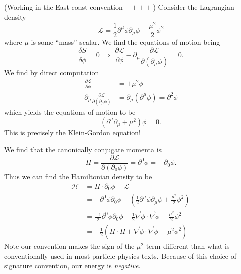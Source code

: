 \begin{ex}\begin{small}
(Working in the East coast convention $-+++$) Consider the Lagrangian density
\begin{equation}%
\mathcal{L} = \frac{1}{2}\partial^{\mu}\phi\partial_{\mu}\phi + \frac{\mu^{2}}{2}\phi^{2}
\end{equation}
where $\mu$ is some ``mass'' scalar. We find the equations of
motion being
\begin{equation}%
\frac{\delta S}{\delta \phi}=0
\;\Rightarrow\;
\frac{\partial\mathcal{L}}{\partial\phi}
-\partial_{\mu}\frac{\partial\mathcal{L}}{\partial(\partial_{\mu}\phi)}
= 0.
\end{equation}
We find by direct computation
\begin{subequations}
\begin{align}
\frac{\partial\mathcal{L}}{\partial\phi} &= +\mu^{2}\phi\\
\partial_{\mu}\frac{\partial\mathcal{L}}{\partial(\partial_{\mu}\phi)}
&= \partial_{\mu}\left(\partial^{\mu}\phi\right)=\partial^{2}\phi 
\end{align}
\end{subequations}
which yields the equations of motion to be
\begin{equation}%
\left(\partial^{\mu}\partial_{\mu}+\mu^{2}\right)\phi = 0.
\end{equation}
This is precisely the Klein-Gordon equation!

We find that the canonically conjugate momenta is
\begin{equation}%
\Pi = \frac{\partial\mathcal{L}}{\partial(\partial_{0}\phi)} =
\partial^{0}\phi = -\partial_{0}\phi.
\end{equation}
Thus we can find the Hamiltonian density to be
\begin{subequations}
\begin{align}
\mathcal{H} &= \Pi\cdot\partial_{0}\phi-\mathcal{L}\\
&= -\partial^{0}\phi\partial_{0}\phi -
\left(\frac{1}{2}\partial^{\mu}\phi\partial_{\mu}\phi+\frac{\mu^{2}}{2}\phi^{2}\right) \\
&=\frac{-1}{2}\partial^{0}\phi\partial_{0}\phi-\frac{1}{2}\vec{\nabla}\phi\cdot\vec{\nabla}\phi-\frac{\mu^{2}}{2}\phi^{2}\\
&=-\frac{1}{2}\left(\Pi\cdot\Pi+\vec{\nabla}\phi\cdot\vec{\nabla}\phi+\mu^{2}\phi^{2}\right)
\end{align}
\end{subequations}
Note our convention makes the sign of the $\mu^{2}$ term
different than what is conventionally used in most particle
physics texts. Because of this choice of signature convention,
our energy is \emph{negative}.


\end{small}
\end{ex}
